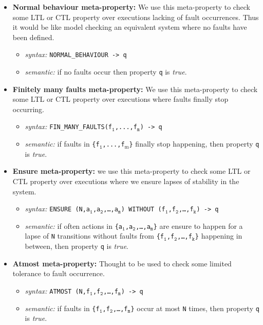 \documentclass{llncs2e/llncs}
\newcommand{\und}[1]{$_{\text{#1}}$}                    %
\newcommand{\undtt}[1]{$_{\texttt{#1}}$}                %
\newcommand{\undfll}[1]{\undtt{#1}}                     %
\newcommand{\textfll}[1]{\texttt{#1}}                   %
\begin{document}
\begin{itemize}
\item \textbf{Normal behaviour meta-property:} We use this meta-property to check some LTL or CTL property over executions lacking of fault occurrences. Thus it would be like model checking an equivalent system where no faults have been defined.
\begin{itemize}
\item \textit{syntax: } \textfll{NORMAL\_BEHAVIOUR -> q}
\item \textit{semantic: } if no faults occur then property \textfll{q} is \textit{true}.
\end{itemize}
\item \textbf{Finitely many faults meta-property:} We use this meta-property to check some LTL or CTL property over executions where faults finally stop occurring.
\begin{itemize}
\item \textit{syntax: } \textfll{FIN\_MANY\_FAULTS(f\undfll{1},...,f\undfll{m}) -> q}
\item \textit{semantic: } if faults in \textfll{\{f\undfll{1},...,f\und{m}\}} finally stop happening, then property \textfll{q} is \textit{true}.
\end{itemize}
\item \textbf{Ensure meta-property:} we use this meta-property to check some LTL or CTL property over executions where we ensure lapses of stability in the system.
\begin{itemize}
\item \textit{syntax: } \textfll{ENSURE (N,a\undfll{1},a\undfll{2},\ldots,a\undfll{m}) WITHOUT (f\undfll{1},f\undfll{2},\ldots,f\undfll{k}) -> q}
\item \textit{semantic: } if often actions in \textfll{\{a\undfll{1},a\undfll{2},\ldots,a\undfll{m}\}} are ensure to happen for a lapse of \textfll{N} transitions without faults from \textfll{\{f\undfll{1},f\undfll{2},\ldots,f\undfll{k}\}} happening in between, then property \textfll{q} is \textit{true}.
\end{itemize}
\item \textbf{Atmost meta-property:} Thought to be used to check some limited tolerance to fault occurrence.
\begin{itemize}
\item \textit{syntax: } \textfll{ATMOST (N,f\undfll{1},f\undfll{2},\ldots,f\undfll{m}) -> q}
\item \textit{semantic: } if faults in \textfll{\{f\undfll{1},f\undfll{2},\ldots,f\undfll{m}\}} occur at most \textfll{N} times, then property \textfll{q} is \textit{true}.
\end{itemize}
\end{itemize}
\end{document}
